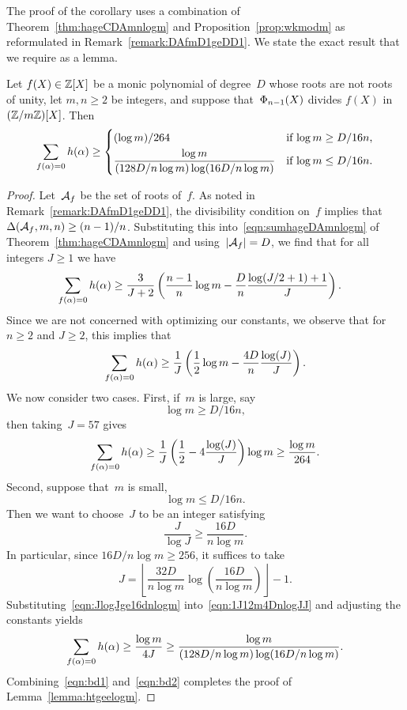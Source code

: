 \documentclass[12pt,reqno]{amsart}
\begin{document}
The proof of the corollary uses a combination of
Theorem~\ref{thm:hageCDAmnlogm} and Proposition~\ref{prop:wkmodm} as
reformulated in Remark~\ref{remark:DAfmD1geDD1}.  We state the exact
result that we require as a lemma.

\begin{lemma}
\label{lemma:htgeelogm}
Let $f(X)\in\mathbb{Z}[X]$ be a monic polynomial of degree~$D$ whose roots
are not roots of unity, let $m,n\ge2$ be integers, and
suppose that~$\Phi_{n-1}(X)$ divides $f(X)$ in $(\mathbb{Z}/m\mathbb{Z})[X]$. Then
\[
  \sum_{f(\alpha)=0}h(\alpha) \ge \begin{cases}
    (\log m)/264 &\text{if $\log m\ge D/16n$,} \\[1\jot]
    \dfrac{\log m}{(128D/n\log m)\log(16D/n\log m)}
          &\text{if $\log m\le D/16n$.} \\
  \end{cases}
\]
\end{lemma}
\begin{proof}
Let~${\mathcal A}_f$ be the set of roots of~$f$.  As noted in
Remark~\ref{remark:DAfmD1geDD1}, the divisibility condition on~$f$
implies that $\Delta({\mathcal A}_f,m,n)\ge (n-1)/n$.  Substituting this
into~\eqref{eqn:sumhageDAmnlogm} of Theorem~\ref{thm:hageCDAmnlogm}
and using~$|{\mathcal A}_f|=D$, we find that for all integers $J\ge1$ we have
\begin{align*}
  \sum_{f(\alpha)=0}h(\alpha)
  &\ge \frac{3}{J+2}
      \left(\frac{n-1}{n}\log m - \frac{D}{n}\frac{\log(J/2+1)+1}{J}\right).
\end{align*}
Since we are not concerned with optimizing our constants, we observe
that for $n\ge2$ and $J\ge2$, this implies that
\begin{equation}
  \label{eqn:1J12m4DnlogJJ}
  \sum_{f(\alpha)=0}h(\alpha)
  \ge \frac{1}{J}
      \left(\frac{1}{2}\log m - \frac{4D}{n}\frac{\log(J)}{J}\right).
\end{equation}
We now consider two cases. First, if~$m$ is large, say
\[
  \log m \ge D/16n,
\]
then taking~$J=57$ gives
\begin{equation}
  \label{eqn:bd1}
  \sum_{f(\alpha)=0}h(\alpha) 
     \ge \frac{1}{J}\left(\frac12-4\frac{\log(J)}{J}\right)\log m
     \ge \frac{\log m}{264}.
\end{equation}
Second, suppose that~$m$ is small,
\[
  \log m \le D/16n.
\]
Then we want to choose~$J$ to be an integer satisfying
\begin{equation}
  \label{eqn:JlogJge16dnlogm}
  \frac{J}{\log J} \ge \frac{16D}{n\log m}.
\end{equation}
In particular, since $16D/n\log m\ge256$, it suffices
to take
\[
  J = \left\lfloor \frac{32D}{n\log m}\log\left(\frac{16D}{n\log m}\right)
     \right\rfloor - 1.
\]
Substituting~\eqref{eqn:JlogJge16dnlogm}
into~\eqref{eqn:1J12m4DnlogJJ} and adjusting the constants yields
\begin{equation}
  \label{eqn:bd2}
  \sum_{f(\alpha)=0}h(\alpha) \ge \frac{\log m}{4J} \ge
    \frac{\log m}{(128D/n\log m)\log(16D/n\log m)}.
\end{equation}
Combining~\eqref{eqn:bd1} and~\eqref{eqn:bd2} completes the proof of
Lemma~\ref{lemma:htgeelogm}.
\end{proof}
\end{document}
